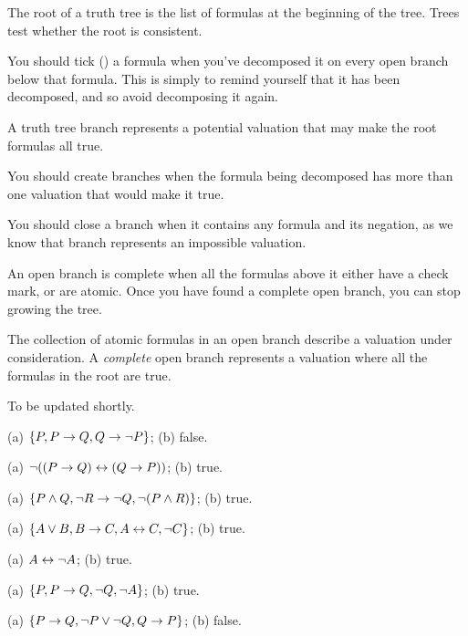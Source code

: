 \documentclass[PHIL101-Textbook.tex]{subfiles}
\begin{document}
\begin{earg}
\item The root of a truth tree is the list of formulas at the beginning of the tree. Trees test whether the root is consistent.
\item You should tick (\checkmark) a formula when you've decomposed it on every open branch below that formula. This is simply to remind yourself that it has been decomposed, and so avoid decomposing it again.
\item A truth tree branch represents a potential valuation that may make the root formulas all true.
\item You should create branches when the formula being decomposed has more than one valuation that would make it true.
\item You should close a branch when it contains any formula and its negation, as we know that branch represents an impossible valuation.
\item An open branch is complete when all the formulas above it either have a check mark, or are atomic. Once you have found a complete open branch, you can stop growing the tree. 
\item The collection of atomic formulas in an open branch describe a valuation under consideration. A \emph{complete} open branch represents a valuation where all the formulas in the root are true.
\end{earg}

To be updated shortly.


\begin{earg}
\item %
(a) $\{P, P \rightarrow Q, Q \rightarrow \neg P\}$; (b) false.
\item %
(a) $\neg((P \rightarrow Q) \leftrightarrow (Q \rightarrow P))$; (b) true.
\item %
(a) $\{P \land Q, \neg R \rightarrow \neg Q, \neg (P \land R)\}$; (b) true.
\item %
(a) $\{A \vee B, B \rightarrow C, A \leftrightarrow C, \neg C\}$; (b) true.
\item %
(a) $A \leftrightarrow \neg A$; (b) true.
\item %
	(a) $\{P, P \rightarrow Q, \neg Q, \neg A\}$; (b) true.
\item %
	(a) $\{P \rightarrow Q, \neg P \vee \neg Q, Q \rightarrow P\}$; (b) false.
 \end{earg}
\end{document}

